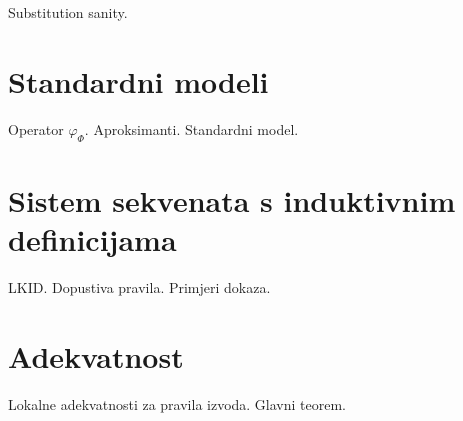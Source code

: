 \begin{lemma}
  Substitution sanity.
\end{lemma}

\section{Standardni modeli}\label{sec:standardni-modeli}
Operator \(\varphi_{\Phi}\). Aproksimanti. Standardni model.

\section{Sistem sekvenata s induktivnim definicijama}\label{sec:sistem-sekvenata}
LKID. Dopustiva pravila. Primjeri dokaza.

\section{Adekvatnost}\label{sec:adekvatnost}
Lokalne adekvatnosti za pravila izvoda. Glavni teorem.


